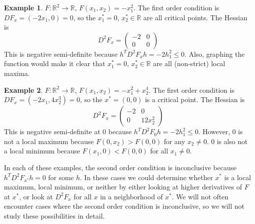 \documentclass[12pt,reqno]{amsart}
\theoremstyle{definition}
\newtheorem{example}{Example}[section]
\def\R{\mathbb{R}}
\renewcommand{\to}{{\rightarrow}}
\begin{document}
\begin{example}
  $F: \R^2 \to \R$, $F(x_1,x_2) = -x_1^2$. The first order condition is
  $DF_x = (-2x_1,0) = 0$, so the $x_1^*=0$, $x_2^* \in \R$ are all
  critical points. The Hessian is
  \[ D^2 F_x = \begin{pmatrix} -2 & 0 \\
    0 & 0 \end{pmatrix} \]
  This is negative semi-definite because $h^T D^2 F_x h = -2 h_1^2
  \leq 0$. Also, graphing the function would make it clear that
  $x_1^*=0$, $x_2^* \in \R$ are all (non-strict) local maxima. 
\end{example}

\begin{example}
  $F: \R^2 \to \R$, $F(x_1,x_2) = -x_1^2 + x_2^4$. The first order
  condition is $DF_x = (-2x_1,4 x_2^3) = 0$, so the $x^* = (0,0)$ is a
  critical point. The Hessian is  
  \[ D^2 F_x = \begin{pmatrix} -2 & 0 \\
    0 & 12 x_2^2 \end{pmatrix} \]
  This is negative semi-definite at $0$ because $h^T D^2 F_0 h = -2 h_1^2
  \leq 0$. However, $0$ is not a local maximum because $F(0,x_2)>
  F(0,0)$ for any $x_2 \neq 0$. $0$ is also not a local minimum
  because $F(x_1,0) < F(0,0)$ for all $x_1 \neq 0$.
\end{example}
In each of these examples, the second order condition is inconclusive
because $h^T D^2 F_{x^*} h = 0$ for some $h$. In these cases we could
determine whether $x^*$ is a local maximum, local minimum, or neither
by either looking at higher derivatives of $F$ at $x^*$, or look at
$D^2 F_{x}$ for all $x$ in a neighborhood of $x^*$. We will not often
encounter cases where the second order condition is inconclusive, so
we will not study these possibilities in detail.
\end{document}
